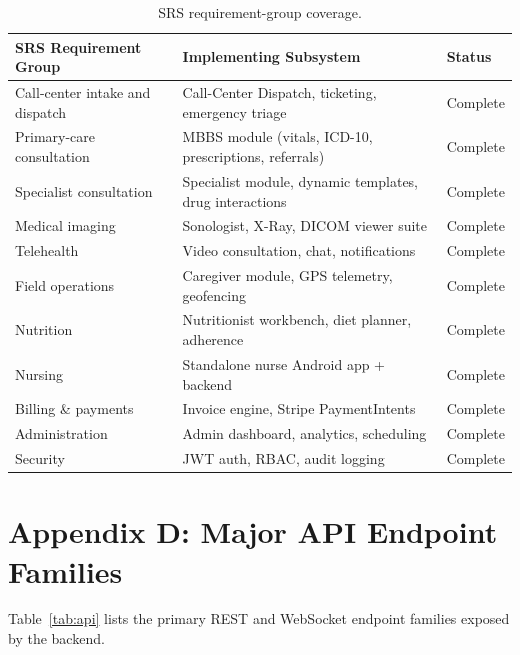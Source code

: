 \documentclass[conference]{IEEEtran}
\begin{document}
\begin{table}[H]
\centering
\small
\renewcommand{\arraystretch}{1.2}
\begin{tabularx}{\textwidth}{>{\raggedright\arraybackslash}p{} >{\raggedright\arraybackslash}X >{\raggedright\arraybackslash}p{}}
\toprule
\textbf{SRS Requirement Group} & \textbf{Implementing Subsystem} & \textbf{Status} \\
\midrule
Call-center intake and dispatch & Call-Center Dispatch, ticketing, emergency triage & Complete \\
Primary-care consultation & MBBS module (vitals, ICD-10, prescriptions, referrals) & Complete \\
Specialist consultation & Specialist module, dynamic templates, drug interactions & Complete \\
Medical imaging & Sonologist, X-Ray, DICOM viewer suite & Complete \\
Telehealth & Video consultation, chat, notifications & Complete \\
Field operations & Caregiver module, GPS telemetry, geofencing & Complete \\
Nutrition & Nutritionist workbench, diet planner, adherence & Complete \\
Nursing & Standalone nurse Android app + backend & Complete \\
Billing \& payments & Invoice engine, Stripe PaymentIntents & Complete \\
Administration & Admin dashboard, analytics, scheduling & Complete \\
Security & JWT auth, RBAC, audit logging & Complete \\
\bottomrule
\end{tabularx}
\caption{SRS requirement-group coverage.}
\label{tab:srs}
\end{table}

\section*{Appendix D: Major API Endpoint Families}

Table~\ref{tab:api} lists the primary REST and WebSocket endpoint families exposed by the backend.
\end{document}
